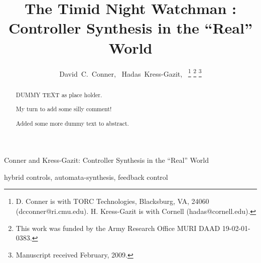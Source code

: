 \documentclass[journal,twoside]{IEEEtran}
\def \TROTITLE {{ The Timid Night Watchman :\\ Controller Synthesis in the ``Real'' World}}
\def \SHORTTROTITLE {{ Controller Synthesis in the ``Real'' World }}
\begin{document}
%

\title{\TROTITLE}

\author{David~C.~Conner,~
  Hadas~Kress-Gazit,~%
  \thanks{D. Conner is with TORC Technologies, Blacksburg, VA, 24060
    (dcconner@ri.cmu.edu).  H. Kress-Gazit is with Cornell
    (hadas@cornell.edu).}%
  \thanks{This work was funded by the Army Research Office MURI DAAD
    19-02-01-0383.}%
  \thanks{Manuscript received February, 2009.}
 }

{Conner and Kress-Gazit: \SHORTTROTITLE }


\maketitle


\begin{abstract}

  DUMMY TEXT as place holder. 

  My turn to add some silly comment! 

  Added some more dummy text to abstract.
\end{abstract}


\begin{IEEEkeywords}
  hybrid controls, automata-synthesis, feedback control
\end{IEEEkeywords}

%
\IEEEpeerreviewmaketitle
\end{document}
